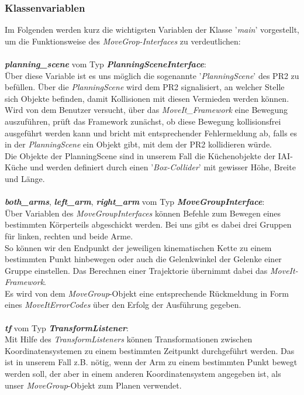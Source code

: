 \documentclass{suturo}
\begin{document}
\subsubsection{Klassenvariablen}
Im Folgenden werden kurz die wichtigsten Variablen der Klasse '\textit{main}' vorgestellt, um die Funktionsweise des \textit{MoveGrop-Interfaces} zu verdeutlichen:\\\\
\textit{\textbf{planning\_scene}} vom Typ \textit{\textbf{PlanningSceneInterface}}:\\
Über diese Variable ist es uns möglich die sogenannte '\textit{PlanningScene}' des PR2 zu befüllen. Über die \textit{PlanningScene} wird dem PR2 signalisiert, an welcher Stelle sich Objekte befinden, damit Kollisionen mit diesen Vermieden werden können. Wird von dem Benutzer versucht, über das \textit{MoveIt\_Framework} eine Bewegung auszuführen, prüft das Framework zunächst, ob diese Bewegung kollisionsfrei ausgeführt werden kann und bricht mit entsprechender Fehlermeldung ab, falls es in der \textit{PlanningScene} ein Objekt gibt, mit dem der PR2 kollidieren würde. \\
Die Objekte der PlanningScene sind in unserem Fall die Küchenobjekte der IAI-Küche und werden definiert durch einen '\textit{Box-Collider}' mit gewisser Höhe, Breite und Länge.\\\\
\textit{\textbf{both\_arms}}, \textit{\textbf{left\_arm}}, \textit{\textbf{right\_arm}} vom Typ \textit{\textbf{MoveGroupInterface}}:\\
Über Variablen des \textit{MoveGroupInterfaces} können Befehle zum Bewegen eines bestimmten Körperteils abgeschickt werden. Bei uns gibt es dabei drei Gruppen für linken, rechten und beide Arme.\\
So können wir den Endpunkt der jeweiligen kinematischen Kette zu einem bestimmten Punkt hinbewegen oder auch die Gelenkwinkel der Gelenke einer Gruppe einstellen. Das Berechnen einer Trajektorie übernimmt dabei das \textit{MoveIt-Framework}.\\
Es wird von dem \textit{MoveGroup}-Objekt eine entsprechende Rückmeldung in Form eines \textit{MoveItErrorCodes} über den Erfolg der Ausführung gegeben.\\\\
\textit{\textbf{tf}} vom Typ \textit{\textbf{TransformListener}}:\\
Mit Hilfe des \textit{TransformListeners} können Transformationen zwischen Koordinatensystemen zu einem bestimmten Zeitpunkt durchgeführt werden. Das ist in unserem Fall z.B. nötig, wenn der Arm zu einem bestimmten Punkt bewegt werden soll, der aber in einem anderen Koordinatensystem angegeben ist, als unser \textit{MoveGroup}-Objekt zum Planen verwendet.\\
\end{document}
